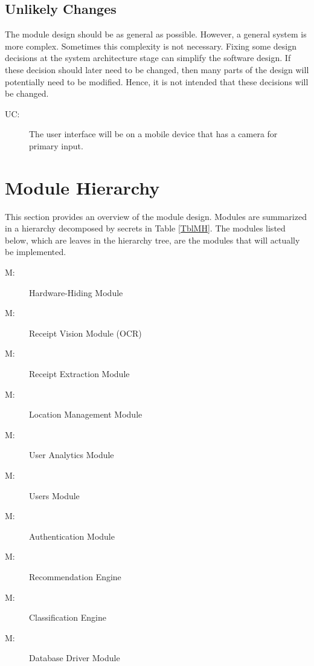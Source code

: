 \documentclass[12pt, titlepage]{article}
\newcounter{ucnum}
\newcommand{\uctheucnum}{UC\theucnum}
\newcounter{mnum}
\newcommand{\mthemnum}{M\themnum}
\begin{document}
\subsection{Unlikely Changes} \label{SecUchange}

The module design should be as general as possible. However, a general system is
more complex. Sometimes this complexity is not necessary. Fixing some design
decisions at the system architecture stage can simplify the software design. If
these decision should later need to be changed, then many parts of the design
will potentially need to be modified. Hence, it is not intended that these
decisions will be changed.

\begin{description}
\item[ \uctheucnum \label{ucIO}:] The user interface will be on a mobile device that has a camera for primary input.

\end{description}

\section{Module Hierarchy} \label{SecMH}

This section provides an overview of the module design. Modules are summarized
in a hierarchy decomposed by secrets in Table \ref{TblMH}. The modules listed
below, which are leaves in the hierarchy tree, are the modules that will
actually be implemented.

\begin{description}
\item [ \mthemnum \label{mHH}:] Hardware-Hiding Module
\item [ \mthemnum \label{mRVision}:] Receipt Vision Module (OCR)
\item [ \mthemnum \label{mReview}:] Receipt Extraction Module
\item [ \mthemnum \label{mLocation}:] Location Management Module
\item [ \mthemnum \label{mAnalytics}:] User Analytics Module
\item [ \mthemnum \label{mUsers}:] Users Module
\item [ \mthemnum \label{mAuth}:] Authentication Module
\item [ \mthemnum \label{mRec}:] Recommendation Engine
\item [ \mthemnum \label{mClassification}:] Classification Engine
\item [ \mthemnum \label{mDBDriver}:] Database Driver Module


\end{description}
\end{document}
